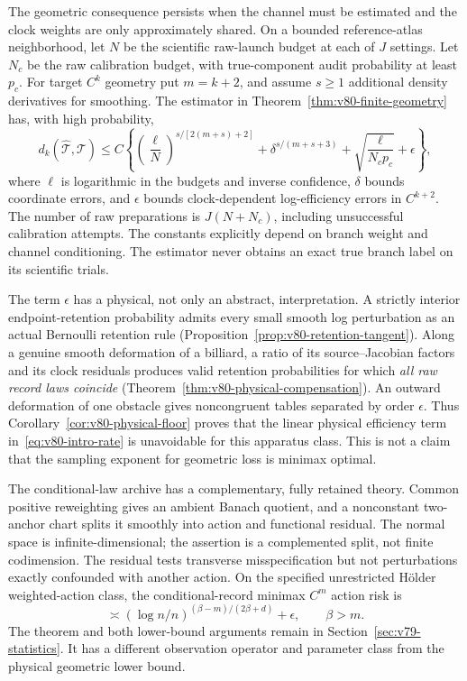 The geometric consequence persists when the channel must be estimated
and the clock weights are only approximately shared.  On a bounded
reference-atlas neighborhood, let $N$ be the scientific raw-launch
budget at each of $J$ settings.  Let $N_c$ be the raw calibration budget,
with true-component audit probability at least $p_c$.  For target
$C^k$ geometry put $m=k+2$, and assume $s\ge1$ additional density
derivatives for smoothing.  The estimator in
Theorem~\ref{thm:v80-finite-geometry} has, with high probability,
\begin{equation}\label{eq:v80-intro-rate}
 d_k(\widehat{\mathcal T},\mathcal T)
 \le C\left\{
       \left(\frac{\ell}{N}\right)^{s/[2(m+s)+2]}
       +\delta^{s/(m+s+3)}
       +\sqrt{\frac{\ell}{N_cp_c}}+\epsilon\right\},
\end{equation}
where $\ell$ is logarithmic in the budgets and inverse confidence,
$\delta$ bounds coordinate errors, and $\epsilon$ bounds
clock-dependent log-efficiency errors in $C^{k+2}$.
The number of raw preparations is $J(N+N_c)$, including unsuccessful
calibration attempts.  The constants explicitly depend on branch
weight and channel conditioning.  The estimator never obtains an
exact true branch label on its scientific trials.

The term $\epsilon$ has a physical, not only an abstract, interpretation.
A strictly interior endpoint-retention probability admits every small
smooth log perturbation as an actual Bernoulli retention rule
(Proposition~\ref{prop:v80-retention-tangent}).  Along a genuine smooth
deformation of a billiard, a ratio of its source--Jacobian factors and
its clock residuals produces valid retention probabilities for which
\emph{all raw record laws coincide}
(Theorem~\ref{thm:v80-physical-compensation}).  An outward deformation
of one obstacle gives noncongruent tables separated by order
$\epsilon$.  Thus Corollary~\ref{cor:v80-physical-floor} proves that
the linear physical efficiency term in~\eqref{eq:v80-intro-rate} is
unavoidable for this apparatus class.  This is not a claim that the
sampling exponent for geometric loss is minimax optimal.

The conditional-law archive has a complementary, fully retained theory.
Common positive reweighting gives an ambient Banach quotient, and a
nonconstant two-anchor chart splits it smoothly into action and
functional residual.  The normal space is infinite-dimensional;
the assertion is a complemented split, not finite codimension.
The residual tests transverse misspecification but not perturbations
exactly confounded with another action.  On the specified unrestricted
H\"older weighted-action class, the conditional-record minimax $C^m$
action risk is
\[
          \asymp (\log n/n)^{(\beta-m)/(2\beta+d)}+\epsilon,
                              \qquad \beta>m.
\]
The theorem and both lower-bound arguments remain in
Section~\ref{sec:v79-statistics}.  It has a different observation
operator and parameter class from the physical geometric lower bound.

